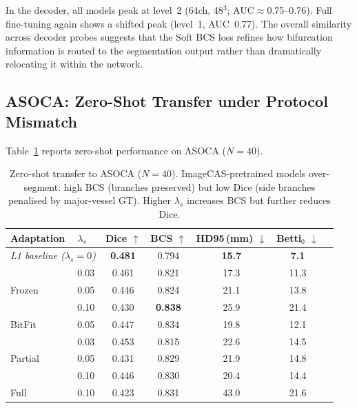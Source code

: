 \documentclass[runningheads]{llncs}
\begin{document}
In the decoder, all models peak at level~2 (64ch, 48$^3$; AUC${\approx}$0.75--0.76).
Full fine-tuning again shows a shifted peak (level~1, AUC~0.77).
The overall similarity across decoder probes suggests that the Soft BCS loss refines how bifurcation information is routed to the segmentation output rather than dramatically relocating it within the network.

\subsection{ASOCA: Zero-Shot Transfer under Protocol Mismatch}
\label{sec:asoca_results}

Table~\ref{tab:zeroshot} reports zero-shot performance on ASOCA ($N{=}40$).

\begin{table}[t]
\caption{Zero-shot transfer to ASOCA ($N{=}40$). ImageCAS-pretrained models over-segment: high BCS (branches preserved) but low Dice (side branches penalised by major-vessel GT). Higher $\lambda_s$ increases BCS but further reduces Dice.}
\label{tab:zeroshot}
\centering
\small
\begin{tabular}{llccccc}
\toprule
Adaptation & $\lambda_s$ & Dice $\uparrow$ & BCS $\uparrow$ & HD95\,(mm) $\downarrow$ & Betti$_0$ $\downarrow$ \\
\midrule
\multicolumn{2}{l}{\textit{L1 baseline ($\lambda_s{=}0$)}} & \textbf{0.481} & 0.794 & \textbf{15.7} & \textbf{7.1} \\
\midrule
\multirow{3}{*}{Frozen}
 & 0.03 & 0.461 & 0.821 & 17.3 & 11.3 \\
 & 0.05 & 0.446 & 0.824 & 21.1 & 13.8 \\
 & 0.10 & 0.430 & \textbf{0.838} & 25.9 & 21.4 \\
\midrule
BitFit & 0.05 & 0.447 & 0.834 & 19.8 & 12.1 \\
\midrule
\multirow{3}{*}{Partial}
 & 0.03 & 0.453 & 0.815 & 22.6 & 14.5 \\
 & 0.05 & 0.431 & 0.829 & 21.9 & 14.8 \\
 & 0.10 & 0.446 & 0.830 & 20.4 & 14.4 \\
\midrule
Full & 0.10 & 0.423 & 0.831 & 43.0 & 21.6 \\
\bottomrule
\end{tabular}
\end{table}
\end{document}
